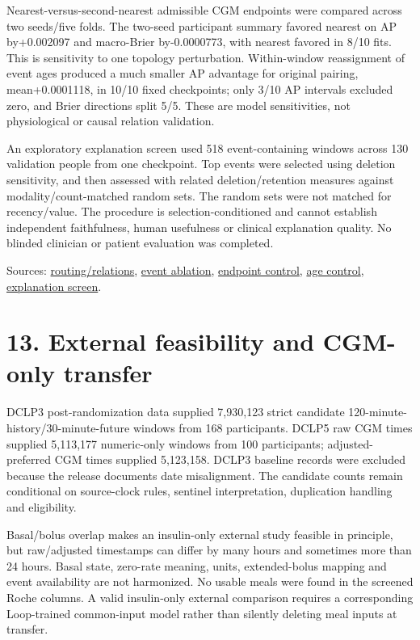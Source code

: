 \documentclass[11pt,a4paper]{article}
\begin{document}
Nearest-versus-second-nearest admissible CGM endpoints were compared across two seeds/five folds. The two-seed participant summary favored nearest on AP by+0.002097 and macro-Brier by-0.0000773, with nearest favored in 8/10 fits. This is sensitivity to one topology perturbation. Within-window reassignment of event ages produced a much smaller AP advantage for original pairing, mean+0.0001118, in 10/10 fixed checkpoints; only 3/10 AP intervals excluded zero, and Brier directions split 5/5. These are model sensitivities, not physiological or causal relation validation.

An exploratory explanation screen used 518 event-containing windows across 130 validation people from one checkpoint. Top events were selected using deletion sensitivity, and then assessed with related deletion/retention measures against modality/count-matched random sets. The random sets were not matched for recency/value. The procedure is selection-conditioned and cannot establish independent faithfulness, human usefulness or clinical explanation quality. No blinded clinician or patient evaluation was completed.

Sources: \href{loop_temporal_relation_pilot.md}{routing/relations}, \href{loop_event_ablation_result_2026_10_25.md}{event ablation}, \href{loop_endpoint_perturbation_result_2026_10_25.md}{endpoint control}, \href{loop_event_age_reassignment_control.md}{age control}, \href{loop_graph_event_explanation_faithfulness.md}{explanation screen}.

\section*{13. External feasibility and CGM-only transfer}
DCLP3 post-randomization data supplied 7,930,123 strict candidate 120-minute-history/30-minute-future windows from 168 participants. DCLP5 raw CGM times supplied 5,113,177 numeric-only windows from 100 participants; adjusted-preferred CGM times supplied 5,123,158. DCLP3 baseline records were excluded because the release documents date misalignment. The candidate counts remain conditional on source-clock rules, sentinel interpretation, duplication handling and eligibility.

Basal/bolus overlap makes an insulin-only external study feasible in principle, but raw/adjusted timestamps can differ by many hours and sometimes more than 24 hours. Basal state, zero-rate meaning, units, extended-bolus mapping and event availability are not harmonized. No usable meals were found in the screened Roche columns. A valid insulin-only external comparison requires a corresponding Loop-trained common-input model rather than silently deleting meal inputs at transfer.
\end{document}
